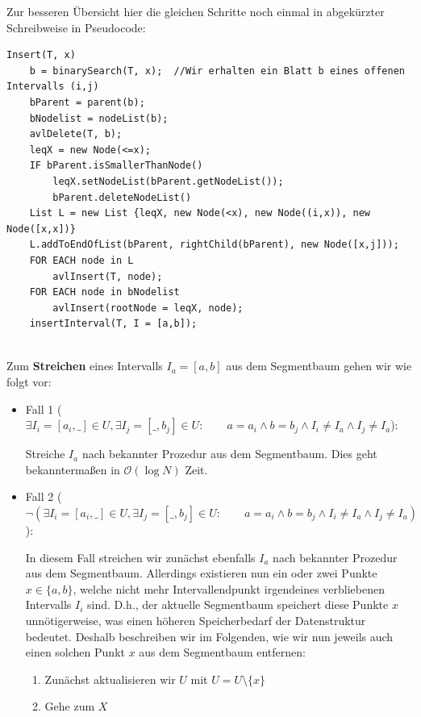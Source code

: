 \documentclass[a4paper]{article}
\begin{document}
\begin{itemize}
\begin{itemize}
\begin{enumerate}
     \end{enumerate}
\end{itemize}

Zur besseren Übersicht hier die gleichen Schritte noch einmal in abgekürzter Schreibweise in
Pseudocode:

\begin{lstlisting}
Insert(T, x)
	b = binarySearch(T, x);  //Wir erhalten ein Blatt b eines offenen Intervalls (i,j)
	bParent = parent(b);
	bNodelist = nodeList(b);
	avlDelete(T, b);
	leqX = new Node(<=x);
	IF bParent.isSmallerThanNode()
		leqX.setNodeList(bParent.getNodeList());
		bParent.deleteNodeList()
	List L = new List {leqX, new Node(<x), new Node((i,x)), new Node([x,x])}
	L.addToEndOfList(bParent, rightChild(bParent), new Node([x,j]));
	FOR EACH node in L
		avlInsert(T, node);
	FOR EACH node in bNodelist
		avlInsert(rootNode = leqX, node);
	insertInterval(T, I = [a,b]);
	
\end{lstlisting}

Zum \textbf{Streichen} eines Intervalls $I_a = [a,b]$ aus dem Segmentbaum gehen wir wie folgt vor:

\begin{itemize}
	\item Fall 1 ($\exists I_i = [a_i, \_] \in U, \exists I_j = [\_, b_j] \in U: \qquad a = a_i \wedge b = b_j \wedge I_i \neq I_a \wedge I_j \neq I_a $):
	
	Streiche $I_a$ nach bekannter Prozedur aus dem Segmentbaum. Dies geht bekanntermaßen in 
	$\mathcal{O}(\log N)$ Zeit. 
	\item Fall 2 ($\neg(\exists I_i = [a_i, \_] \in U, \exists I_j = [\_, b_j] \in U: \qquad a = a_i \wedge b = b_j \wedge I_i \neq I_a \wedge I_j \neq I_a )$):
	
	In diesem Fall streichen wir zunächst ebenfalls $I_a$ nach bekannter Prozedur aus dem Segmentbaum.
	Allerdings existieren nun ein oder zwei Punkte $x \in \{a,b\}$, welche nicht mehr Intervallendpunkt
	irgendeines verbliebenen Intervalls $I_i$ sind. D.h., der aktuelle Segmentbaum speichert diese
	Punkte $x$ unnötigerweise, was einen höheren Speicherbedarf der Datenstruktur bedeutet.
	Deshalb beschreiben wir im Folgenden, wie wir nun jeweils auch einen solchen Punkt $x$ aus dem Segmentbaum
	entfernen:
	
	\begin{enumerate}
		\item Zunächst aktualisieren wir $U$ mit $U = U\setminus \{x\}$
		\item Gehe zum $X$
	\end{enumerate}
\end{itemize}

\end{itemize}
\end{document}
